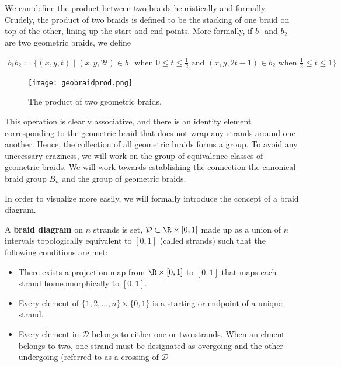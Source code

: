 We can define the product between two braids heuristically and formally. Crudely, the product of two braids is defined to be the stacking of one braid on top of the other, lining up the start and end points. More formally, if $b_1$ and $b_2$ are two geometric braids, we define 

\begin{equation}
\begin{aligned}
	b_1b_2 \coloneq \{(x,y,t)\mid (x,y,2t)\in b_1 \text{ when }0\leq t\leq \frac{1}{2} \text{ and }   (x,y,2t - 1)\in b_2 \text{ when }\frac{1}{2}\leq t\leq 1\}
\end{aligned}
\end{equation}

\begin{figure}[H]
	\centering
	\texttt{[image: geobraidprod.png]}
	\caption{The product of two geometric braids.}
\end{figure}

This operation is clearly associative, and there is an identity element corresponding to the geometric braid that does not wrap any strands around one another. Hence, the collection of all geometric braids forms a group. To avoid any unecessary craziness, we will work on the group of equivalence classes of geometric braids. We will work towards establishing the connection the canonical braid group $B_n$ and the group of geometric braids.

In order to visualize more easily, we will formally introduce the concept of a braid diagram.

\begin{definition}
	A \textbf{braid diagram} on $n$ strands is set, $\mathcal{D}\subset \R\times [0,1]$ made up as a union of $n$ intervals topologically equivalent to $[0,1]$ (called strands) such that the following conditions are met:
\begin{itemize}
	\item There exists a projection map from $\R\times [0,1]$ to $[0,1]$ that maps each strand homeomorphically to $[0,1]$.
	\item Every element of $\{1,2,\hdots,n\}\times\{0,1\}$ is a starting or endpoint of a unique strand.
	\item Every element in $\mathcal{D}$ belongs to either one or two strands. When an elment belongs to two, one strand must be designated as overgoing and the other undergoing (referred to as a crossing of $\mathcal{D}$
\end{itemize}
\end{definition}


